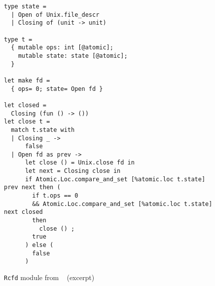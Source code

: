 \begin{figure}[t!]
\begin{verbatim}
type state =
  | Open of Unix.file_descr
  | Closing of (unit -> unit)

type t =
  { mutable ops: int [@atomic];
    mutable state: state [@atomic];
  }

let make fd =
  { ops= 0; state= Open fd }

let closed =
  Closing (fun () -> ())
let close t =
  match t.state with
  | Closing _ ->
      false
  | Open fd as prev ->
      let close () = Unix.close fd in
      let next = Closing close in
      if Atomic.Loc.compare_and_set [%atomic.loc t.state] prev next then (
        if t.ops == 0
        && Atomic.Loc.compare_and_set [%atomic.loc t.state] next closed
        then
          close () ;
        true
      ) else (
        false
      )
\end{verbatim}
\caption{\texttt{Rcfd} module from \Eio~\cite{eio} (excerpt)}
\label{fig:rcfd}
\end{figure}